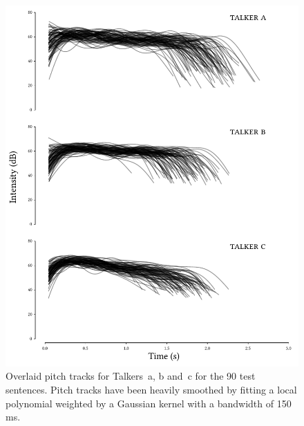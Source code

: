 \begin{figure}[pbt]
	\begin{centering}
	\includegraphics{figures/posthocs/IntensityTracks.pdf}
	\caption[Intensity track overlays of the test sentences]{Overlaid pitch tracks for Talkers~\ac{a}, \ac{b} and~\ac{c} for the 90 test sentences.  Pitch tracks have been heavily smoothed by fitting a local polynomial weighted by a Gaussian kernel with a bandwidth of 150 ms.\label{fig:IntensityTracks}}
	\end{centering}
\end{figure}

